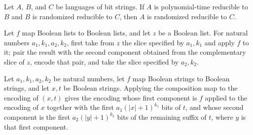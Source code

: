 \begin{theorem}
\label{Randomized.RandReducible.of_polyTimeReducible_left}
\leanok
{}
Let $A$, $B$, and $C$ be languages of bit strings. If $A$ is polynomial-time reducible
to $B$ and $B$ is randomized reducible to $C$, then $A$ is randomized reducible to $C$.
\end{theorem}

\begin{definition}
\label{Randomized.composeMap}
\leanok
{}
Let $f$ map Boolean lists to Boolean lists, and let $z$ be a Boolean list. For natural
numbers $a_1,k_1,a_2,k_2$, first take from $z$ the slice specified by $a_1,k_1$ and
apply $f$ to it; pair the result with the second component obtained from the
complementary slice of $z$, encode that pair, and take the slice specified by $a_2,k_2$.
\end{definition}

\begin{theorem}
\label{Randomized.composeMap_pairEncode}
\leanok
{}
Let $a_1,k_1,a_2,k_2$ be natural numbers, let $f$ map Boolean strings to Boolean
strings, and let $x,t$ be Boolean strings. Applying the composition map to the encoding
of $(x,t)$ gives the encoding whose first component is $f$ applied to the encoding of
$x$ together with the first $a_1(|x|+1)^{k_1}$ bits of $t$, and whose second component
is the first $a_2(|y|+1)^{k_2}$ bits of the remaining suffix of $t$, where $y$ is that
first component.
\end{theorem}

